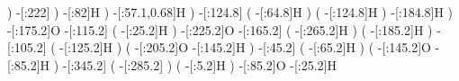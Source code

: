 {                                  )
                        -[:222]%
                              )
                     -[:82]H%
                          )
          -[:57.1,0.68]H%
                      )
          -[:124.8]%
                      (
               -[:64.8]H%
                      )
                      (
              -[:124.8]H%
                      )
          -[:184.8]H%
                  )
      -[:175.2]O%
      -[:115.2]%
                  (
           -[:25.2]H%
                  )
      -[:225.2]O%
      -[:165.2]%
                  (
          -[:265.2]H%
                  )
                  (
          -[:185.2]H%
                  )
      -[:105.2]%
                  (
          -[:125.2]H%
                  )
                  (
          -[:205.2]O%
          -[:145.2]H%
                  )
       -[:45.2]%
                  (
           -[:65.2]H%
                  )
                  (
          -[:145.2]O%
           -[:85.2]H%
                  )
      -[:345.2]%
                  (
          -[:285.2]%
                  )
                  (
            -[:5.2]H%
                  )
       -[:85.2]O%
       -[:25.2]H%
    }